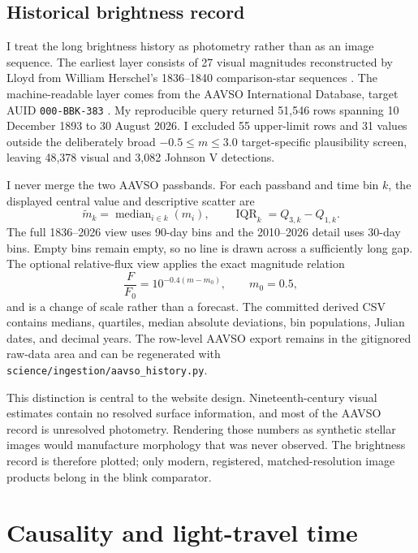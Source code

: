 \documentclass[11pt,a4paper]{article}
\begin{document}
\subsection{Historical brightness record}

I treat the long brightness history as photometry rather than as an image
sequence. The earliest layer consists of 27 visual magnitudes reconstructed by
Lloyd from William Herschel's 1836--1840 comparison-star sequences
\cite{lloyd2020}. The machine-readable layer comes from the AAVSO International
Database, target AUID \texttt{000-BBK-383} \cite{aavso2026}. My reproducible
query returned 51,546 rows spanning 10 December 1893 to 30 August 2026. I
excluded 55 upper-limit rows and 31 values outside the deliberately broad
$-0.5\leq m\leq3.0$ target-specific plausibility screen, leaving 48,378 visual
and 3,082 Johnson V detections.

I never merge the two AAVSO passbands. For each passband and time bin $k$, the
displayed central value and descriptive scatter are
\begin{equation}
  \widetilde m_k=\operatorname{median}_{i\in k}(m_i),\qquad
  \operatorname{IQR}_k=Q_{3,k}-Q_{1,k}.
\end{equation}
The full 1836--2026 view uses 90-day bins and the 2010--2026 detail uses 30-day
bins. Empty bins remain empty, so no line is drawn across a sufficiently long
gap. The optional relative-flux view applies the exact magnitude relation
\begin{equation}
  \frac{F}{F_0}=10^{-0.4(m-m_0)},\qquad m_0=0.5,
\end{equation}
and is a change of scale rather than a forecast. The committed derived CSV
contains medians, quartiles, median absolute deviations, bin populations,
Julian dates, and decimal years. The row-level AAVSO export remains in the
gitignored raw-data area and can be regenerated with
\texttt{science/ingestion/aavso\_history.py}.

This distinction is central to the website design. Nineteenth-century visual
estimates contain no resolved surface information, and most of the AAVSO
record is unresolved photometry. Rendering those numbers as synthetic stellar
images would manufacture morphology that was never observed. The brightness
record is therefore plotted; only modern, registered, matched-resolution image
products belong in the blink comparator.

\section{Causality and light-travel time}
\end{document}
